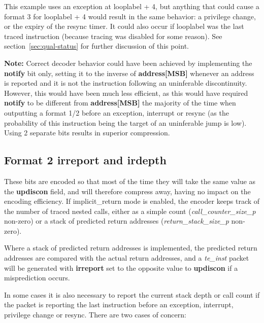 This example uses an exception at looplabel + 4, but anything that could cause a format 3 for looplabel + 4 would result in 
the same behavior: a privilege change, or the expiry of the resync timer.  It could also occur if looplabel was the last
traced instruction (because tracing was disabled for some reason).  See section~\ref{sec:qual-status} for further discussion 
of this point.

\textbf{Note:} Correct decoder behavior could have been achieved by implementing the \textbf{notify} bit only, setting it 
to the inverse of \textbf{address[MSB]} whenever an address is reported and it is not the instruction following an 
uninferable discontinuity.  However, this would have been much less efficient, as this would have required \textbf{notify} 
to be different from \textbf{address[MSB]} the majority of the time when outputting a format 1/2 before an exception,
interrupt or resync (as the probability of this instruction being the target of an uninferable jump is low).  Using 2 
separate bits results in superior compression.

\subsection{Format 2 \textbf{irreport} and \textbf{irdepth}} \label{sec:irxx}
These bits are encoded so that most of the time they will take the same value as the \textbf{updiscon} field,
and will therefore compress away, having no impact on the encoding efficiency.  If implicit\_return mode is enabled, the
encoder keeps track of the number of traced nested calls, either as a simple count (\textit{call\_counter\_size\_p} 
non-zero) or a stack of predicted return addresses (\textit{return\_stack\_size\_p} non-zero).  

Where a stack of predicted return addresses is implemented, the predicted return addresses are compared with the actual 
return addresses, and a \textit{te\_inst} packet will be generated with \textbf{irreport} set to the opposite value to
\textbf{updiscon} if a misprediction occurs.  

In some cases it is also necessary to report the current stack depth or call count if the packet is reporting the last 
instruction before an exception, interrupt, privilege change or resync.  There are two cases of concern:

